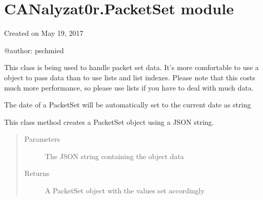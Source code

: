 \documentclass[letterpaper,10pt,english]{sphinxmanual}
\begin{document}
\section{CANalyzat0r.PacketSet module}
\label{\detokenize{src:canalyzat0r-packetset-module}}\label{\detokenize{src:module-src.PacketSet}}
Created on May 19, 2017

@author: pschmied

\begin{fulllineitems}
\label{\detokenize{src:src.PacketSet.PacketSet}}
This class is being used to handle packet set data.
It’s more comfortable to use a object to pass data
than to use lists and list indexes. Please note that
this costs much more performance, so please use lists
if you have to deal with much data.

\begin{fulllineitems}
\label{\detokenize{src:src.PacketSet.PacketSet.__init__}}
The date of a PacketSet will be automatically set to the current date as string

\end{fulllineitems}


\begin{fulllineitems}
\label{\detokenize{src:src.PacketSet.PacketSet.fromJSON}}
This class method creates a PacketSet object using a JSON string.
\begin{quote}\begin{description}
\item[{Parameters}] \leavevmode
{} \textendash{} The JSON string containing the object data

\item[{Returns}] \leavevmode
A PacketSet object with the values set accordingly

\end{description}\end{quote}


\end{fulllineitems}
\end{fulllineitems}
\end{document}
